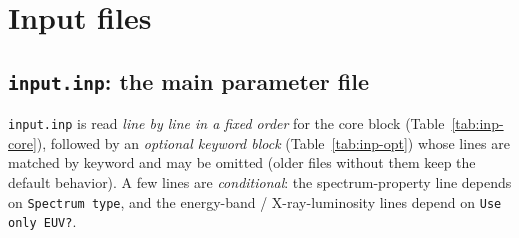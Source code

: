 \documentclass[english,a4paper]{my_memo}
\begin{document}
\section{Input files}\label{sec:inputs}

\subsection{\texttt{input.inp}: the main parameter file}
\texttt{input.inp} is read \emph{line by line in a fixed order} for the core
block (Table~\ref{tab:inp-core}), followed by an \emph{optional keyword block}
(Table~\ref{tab:inp-opt}) whose lines are matched by keyword and may be omitted
(older files without them keep the default behavior). A few lines are
\emph{conditional}: the spectrum-property line depends on \texttt{Spectrum type},
and the energy-band / X-ray-luminosity lines depend on \texttt{Use only EUV?}.
\end{document}
